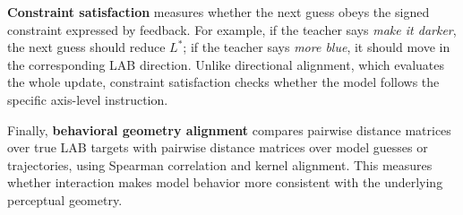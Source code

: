 \documentclass[11pt]{article}
\begin{document}
\textbf{Constraint satisfaction} measures whether the next guess obeys the
signed constraint expressed by feedback. For example, if the teacher says
\textit{make it darker}, the next guess should reduce $L^\ast$; if the
teacher says \textit{more blue}, it should move in the corresponding LAB
direction. Unlike directional alignment, which evaluates the whole update,
constraint satisfaction checks whether the model follows the specific
axis-level instruction.

Finally, \textbf{behavioral geometry alignment} compares pairwise distance
matrices over true LAB targets with pairwise distance matrices over model
guesses or trajectories, using Spearman correlation and kernel alignment.
This measures whether interaction makes model behavior more consistent with
the underlying perceptual geometry.







\end{document}
